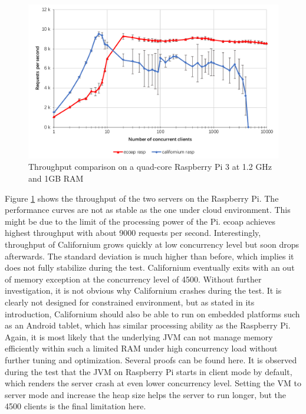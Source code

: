 \begin{figure}[!htbp]
\centering
\includegraphics[scale = 0.8]{throughput_rasp}
\caption{Throughput comparison on a quad-core Raspberry Pi 3 at 1.2 GHz and 1GB RAM}
\label{fig:throughput_rasp}
\end{figure}

Figure \ref{fig:throughput_rasp} shows the throughput of the two servers on the Raspberry Pi. The performance curves are not as stable as the one under cloud environment. This might be due to the limit of the processing power of the Pi. ecoap achieves highest throughput with about 9000 requests per second. Interestingly, throughput of Californium grows quickly at low concurrency level but soon drops afterwards. The standard deviation is much higher than before, which implies it does not fully stabilize during the test. Californium eventually exits with an out of memory exception at the concurrency level of 4500. Without further investigation, it is not obvious why Californium crashes during the test. It is clearly not designed for constrained environment, but as stated in its introduction, Californium should also be able to run on embedded platforms such as an Android tablet, which has similar processing ability as the Raspberry Pi. Again, it is most likely that the underlying JVM can not manage memory efficiently within such a limited RAM under high concurrency load without further tuning and optimization. Several proofs can be found here. It is observed during the test that the JVM on Raspberry Pi starts in client mode by default, which renders the server crash at even lower concurrency level. Setting the VM to server mode and increase the heap size helps the server to run longer, but the 4500 clients is the final limitation here. 

